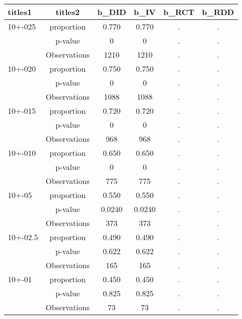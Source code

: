 \documentclass[]{article}
\begin{document}
\begin{tabular}{lccccc} \hline
titles1 & titles2 & b\_DID & b\_IV & b\_RCT & b\_RDD \\ \hline
10+-025 & proportion & 0.770 & 0.770 & . & . \\
 & p-value & 0 & 0 & . & . \\
 & Observations & 1210 & 1210 & . & . \\
10+-020 & proportion & 0.750 & 0.750 & . & . \\
 & p-value & 0 & 0 & . & . \\
 & Observations & 1088 & 1088 & . & . \\
10+-015 & proportion & 0.720 & 0.720 & . & . \\
 & p-value & 0 & 0 & . & . \\
 & Observations & 968 & 968 & . & . \\
10+-010 & proportion & 0.650 & 0.650 & . & . \\
 & p-value & 0 & 0 & . & . \\
 & Observations & 775 & 775 & . & . \\
10+-05 & proportion & 0.550 & 0.550 & . & . \\
 & p-value & 0.0240 & 0.0240 & . & . \\
 & Observations & 373 & 373 & . & . \\
10+-02.5 & proportion & 0.490 & 0.490 & . & . \\
 & p-value & 0.622 & 0.622 & . & . \\
 & Observations & 165 & 165 & . & . \\
10+-01 & proportion & 0.450 & 0.450 & . & . \\
 & p-value & 0.825 & 0.825 & . & . \\
 & Observations & 73 & 73 & . & . \\ \hline
\end{tabular}
\end{document}

